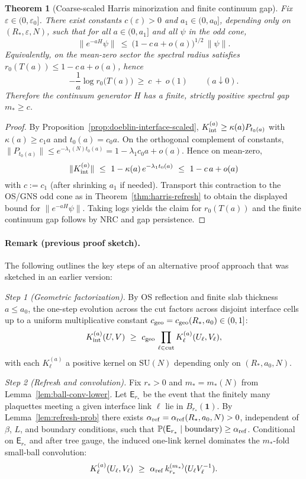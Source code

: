 \documentclass[11pt]{amsart}
\theoremstyle{plain}
\newtheorem{theorem}{Theorem}[section]
\theoremstyle{definition}
\theoremstyle{remark}
\begin{document}
\begin{theorem}[Coarse-scaled Harris minorization and finite continuum gap]\label{thm:harris-refresh-scaled}
Fix $\varepsilon\in(0,\varepsilon_0]$. There exist constants $c(\varepsilon)>0$ and $a_1\in(0,a_0]$, depending only on $(R_*,\varepsilon,N)$, such that for all $a\in(0,a_1]$ and all $\psi$ in the odd cone,
\[
  \|e^{-aH}\psi\|\ \le\ \bigl(1- c\,a + o(a)\bigr)^{1/2}\,\|\psi\|.
\]
Equivalently, on the mean-zero sector the spectral radius satisfies $r_0(T(a))\le 1- c\,a+o(a)$, hence
\[
  -\frac{1}{a}\log r_0\big(T(a)\big)\ \ge\ c\ +\ o(1)\qquad (a\downarrow 0).
\]
Therefore the continuum generator $H$ has a finite, strictly positive spectral gap $m_*\ge c$.
\end{theorem}
\begin{proof}
By Proposition~\ref{prop:doeblin-interface-scaled}, $K_{\rm int}^{(a)}\ge \kappa(a) P_{t_0(a)}$ with $\kappa(a)\ge c_1 a$ and $t_0(a)=c_0 a$. On the orthogonal complement of constants, $\|P_{t_0(a)}\|\le e^{-\lambda_1(N) t_0(a)}=1-\lambda_1 c_0 a+o(a)$. Hence on mean-zero,
\[
  \|K_{\rm int}^{(a)}\|\ \le\ 1- \kappa(a)\,e^{-\lambda_1 t_0(a)}\ \le\ 1- c\,a + o(a)
\]
with $c:=c_1$ (after shrinking $a_1$ if needed). Transport this contraction to the OS/GNS odd cone as in Theorem~\ref{thm:harris-refresh} to obtain the displayed bound for $\|e^{-aH}\psi\|$. Taking logs yields the claim for $r_0(T(a))$ and the finite continuum gap follows by NRC and gap persistence.
\end{proof}

\paragraph{Remark (previous proof sketch).} The following outlines the key steps of an alternative proof approach that was sketched in an earlier version:

\emph{Step 1 (Geometric factorization).} By OS reflection and finite slab thickness $a\le a_0$, the one-step evolution across the cut factors across disjoint interface cells up to a uniform multiplicative constant $c_{\rm geo}=c_{\rm geo}(R_*,a_0)\in(0,1]$:
\[
  K_{\rm int}^{(a)}(U,V)\ \ge\ c_{\rm geo}\,\prod_{\ell\in\mathrm{cut}} K_\ell^{(a)}(U_\ell,V_\ell),
\]
with each $K_\ell^{(a)}$ a positive kernel on $\mathrm{SU}(N)$ depending only on $(R_*,a_0,N)$.

\emph{Step 2 (Refresh and convolution).} Fix $r_*>0$ and $m_*=m_*(N)$ from Lemma~\ref{lem:ball-conv-lower}. Let $\mathsf E_{r_*}$ be the event that the finitely many plaquettes meeting a given interface link $\ell$ lie in $B_{r_*}(\mathbf 1)$. By Lemma~\ref{lem:refresh-prob} there exists $\alpha_{\rm ref}=\alpha_{\rm ref}(R_*,a_0,N)>0$, independent of $\beta$, $L$, and boundary conditions, such that $\mathbb P(\mathsf E_{r_*}\mid \text{boundary})\ge \alpha_{\rm ref}$. Conditional on $\mathsf E_{r_*}$ and after tree gauge, the induced one-link kernel dominates the $m_*$-fold small-ball convolution:
\[
  K_\ell^{(a)}(U_\ell,V_\ell)\ \ge\ \alpha_{\rm ref}\,k_{r_*}^{(m_*)}(U_\ell V_\ell^{-1}).
\]
\end{document}
